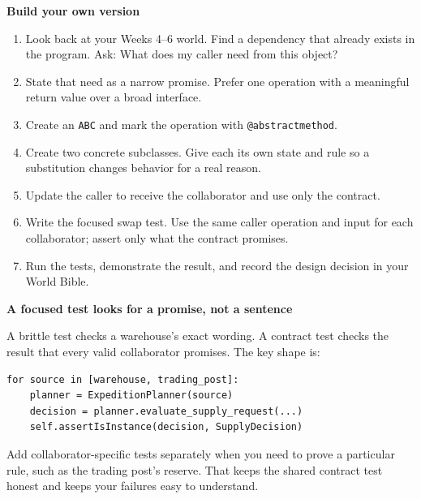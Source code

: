 \documentclass[11pt]{article}
\newcommand{\code}[1]{\texttt{#1}}
\newcommand{\heading}[1]{\vspace{0.6em}\noindent\colorbox{softblue}{\parbox{\dimexpr\linewidth-2\fboxsep}{\large\bfseries\color{navy}#1}}\vspace{0.25em}}
\begin{document}
\heading{Build your own version}
\begin{enumerate}
  \item Look back at your Weeks 4--6 world. Find a dependency that already
  exists in the program. Ask: What does my caller need from this object?
  \item State that need as a narrow promise. Prefer one operation with a
  meaningful return value over a broad interface.
  \item Create an \code{ABC} and mark the operation with \code{@abstractmethod}.
  \item Create two concrete subclasses. Give each its own state and rule so a
  substitution changes behavior for a real reason.
  \item Update the caller to receive the collaborator and use only the contract.
  \item Write the focused swap test. Use the same caller operation and input for
  each collaborator; assert only what the contract promises.
  \item Run the tests, demonstrate the result, and record the design decision in
  your World Bible.
\end{enumerate}

\heading{A focused test looks for a promise, not a sentence}
A brittle test checks a warehouse's exact wording. A contract test checks the
result that every valid collaborator promises. The key shape is:
\begin{verbatim}
for source in [warehouse, trading_post]:
    planner = ExpeditionPlanner(source)
    decision = planner.evaluate_supply_request(...)
    self.assertIsInstance(decision, SupplyDecision)
\end{verbatim}
Add collaborator-specific tests separately when you need to prove a particular
rule, such as the trading post's reserve. That keeps the shared contract test
honest and keeps your failures easy to understand.
\end{document}

